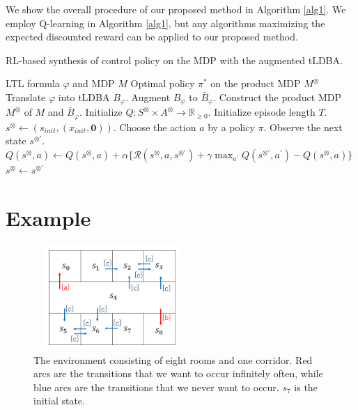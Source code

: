 \documentclass[a4j,12pt,oneside,openany,english]{jsbook}
\begin{document}
We show the overall procedure of our proposed method in Algorithm \ref{alg1}. We employ Q-learning in Algorithm \ref{alg1}, but any algorithms maximizing the expected discounted reward can be applied to our proposed method.
\begin{algorithm}
 \caption{RL-based synthesis of control policy on the MDP with the augmented tLDBA.}
 \begin{algorithmic}[1]
 \renewcommand{\algorithmicrequire}{\textbf{Input:}}
 \renewcommand{\algorithmicensure}{\textbf{Output:}}
 \REQUIRE LTL formula $\varphi$ and MDP $M$
 \ENSURE  Optimal policy $\pi^{\ast}$ on the product MDP $M^{\otimes}$
 \STATE Translate $\varphi$ into tLDBA $B_{\varphi}$.
  \STATE Augment $B_{\varphi}$ to $\bar{B}_{\varphi}$.
  \STATE Construct the product MDP $M^{\otimes}$ of $M$ and $\bar{B}_{\varphi}$.
  \STATE Initialize $Q:S^{\otimes} \times A^{\otimes} \rightarrow \mathbb{R}_{\geq 0}$.
  \STATE Initialize episode length $T$.
  \STATE $s^{\otimes} \leftarrow (s_{init},(x_{init},\bm{0}))$.
  \STATE Choose the action $a$ by a policy $\pi$.
  \STATE Observe the next state $s^{\otimes \prime}$.
  \STATE $Q(s^{\otimes},a) \leftarrow Q(s^{\otimes},a) + \alpha \{ \mathcal{R}(s^{\otimes},a,s^{\otimes \prime}) + \gamma \max_{a^{\prime}}Q(s^{\otimes \prime},a^{\prime}) - Q(s^{\otimes},a) \}$
  \STATE $s^{\otimes} \leftarrow s^{\otimes \prime}$
  \ENDFOR
  \ENDWHILE
 \end{algorithmic}
 \label{alg1}
 \end{algorithm}

 \section{Example}

\begin{figure}[bp]
    \centering
    \includegraphics[bb=0 0 377 290,height=4cm,width=6cm]{MDP_corridor.png}
    \caption{The environment consisting of eight rooms and one corridor. Red arcs are the transitions that we want to occur infinitely often, while blue arcs are the transitions that we never want to occur. $s_7$ is the initial state.}
    \label{Grid1}
\end{figure}
\end{document}
